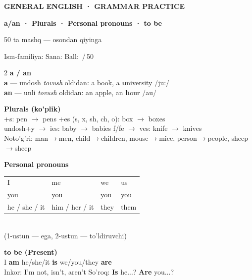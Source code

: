 \documentclass[11pt,a4paper]{article}
\newcommand{\bl}[1][2.2cm]{\underline{\hspace{#1}}}
\begin{document}
\begin{tcolorbox}[colback=navy,colframe=navy,coltext=white,arc=4mm,boxrule=0pt,
  left=12pt,right=12pt,top=10pt,bottom=10pt]
  {\small\color{amber}\bfseries GENERAL ENGLISH · GRAMMAR PRACTICE}\par\smallskip
  {\LARGE\bfseries a/an · Plurals · Personal pronouns · to be}\par\smallskip
  {\normalsize 50 ta mashq — osondan qiyinga}
\end{tcolorbox}

\smallskip
Ism-familiya: \bl[6.5cm] \hfill Sana: \bl[3cm] \hfill Ball: \bl[1.5cm]\,/\,50

\begin{tcolorbox}[colback=lav,colframe=indigo,arc=3mm,boxrule=0.8pt,
  title={\bfseries Qisqa qoidalar},coltitle=white,colbacktitle=indigo,
  left=6pt,right=6pt,top=4pt,bottom=4pt]
\small
\begin{multicols}{2}
\textbf{a / an}\\
\textbf{a} — undosh \emph{tovush} oldidan: a book, a \textbf{u}niversity /ju:/\\
\textbf{an} — unli \emph{tovush} oldidan: an apple, an \textbf{h}our /au/

\smallskip
\textbf{Plurals (ko'plik)}\\
+s: pen $\to$ pens \quad +es (s, x, sh, ch, o): box $\to$ boxes\\
undosh+y $\to$ ies: baby $\to$ babies \quad f/fe $\to$ ves: knife $\to$ knives\\
Noto'g'ri: man$\to$men, child$\to$children, mouse$\to$mice, person$\to$people, sheep$\to$sheep

\columnbreak
\textbf{Personal pronouns}\\
\begin{tabular}{@{}ll@{\qquad}ll@{}}
I & me & we & us\\
you & you & you & you\\
he / she / it & him / her / it & they & them
\end{tabular}\\
(1-ustun — ega, 2-ustun — to'ldiruvchi)

\smallskip
\textbf{to be (Present)}\\
I \textbf{am} \quad he/she/it \textbf{is} \quad we/you/they \textbf{are}\\
Inkor: I'm not, isn't, aren't \quad So'roq: \textbf{Is} he...? \textbf{Are} you...?
\end{multicols}
\end{tcolorbox}
\end{document}
